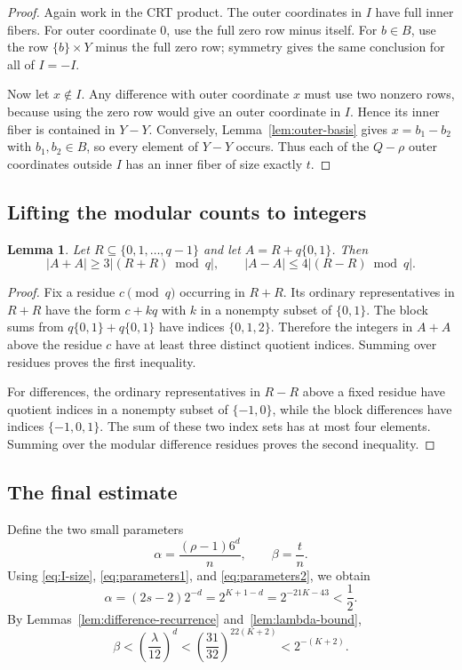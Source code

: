 \documentclass[11pt,reqno]{amsart}
\theoremstyle{plain}
\newtheorem{lemma}[theorem]{Lemma}
\theoremstyle{definition}
\theoremstyle{remark}
\theoremstyle{named}
\newcommand{\card}[1]{\lvert #1\rvert}
\begin{document}
\begin{proof}
Again work in the CRT product.  The outer coordinates in $I$ have full inner
fibers.  For outer coordinate $0$, use the full zero row minus itself.  For
$b\in B$, use the row $\{b\}\times Y$ minus the full zero row; symmetry gives
the same conclusion for all of $I=-I$.

Now let $x\notin I$.  Any difference with outer coordinate $x$ must use two
nonzero rows, because using the zero row would give an outer coordinate in
$I$.  Hence its inner fiber is contained in $Y-Y$.  Conversely,
Lemma~\ref{lem:outer-basis} gives $x=b_1-b_2$ with $b_1,b_2\in B$, so every
element of $Y-Y$ occurs.  Thus each of the $Q-\rho$ outer coordinates outside
$I$ has an inner fiber of size exactly $t$.
\end{proof}

\subsection{Lifting the modular counts to integers}

\begin{lemma}\label{lem:lifting}
Let $R\subseteq\{0,1,\ldots,q-1\}$ and let $A=R+q\{0,1\}$.  Then
\[
 \card{A+A}\ge3\card{(R+R)\bmod q},
 \qquad
 \card{A-A}\le4\card{(R-R)\bmod q}.
\]
\end{lemma}

\begin{proof}
Fix a residue $c\pmod q$ occurring in $R+R$.  Its ordinary representatives in
$R+R$ have the form $c+kq$ with $k$ in a nonempty subset of $\{0,1\}$.  The
block sums from $q\{0,1\}+q\{0,1\}$ have indices $\{0,1,2\}$.  Therefore the
integers in $A+A$ above the residue $c$ have at least three distinct quotient
indices.  Summing over residues proves the first inequality.

For differences, the ordinary representatives in $R-R$ above a fixed residue
have quotient indices in a nonempty subset of $\{-1,0\}$, while the block
differences have indices $\{-1,0,1\}$.  The sum of these two index sets has at
most four elements.  Summing over the modular difference residues proves the
second inequality.
\end{proof}

\subsection{The final estimate}

Define the two small parameters
\[
 \alpha=\frac{(\rho-1)6^d}{n},
 \qquad
 \beta=\frac{t}{n}.
\]
Using \eqref{eq:I-size}, \eqref{eq:parameters1}, and
\eqref{eq:parameters2}, we obtain
\begin{equation}\label{eq:alpha}
 \alpha=(2s-2)2^{-d}=2^{K+1-d}=2^{-21K-43}<\frac12.
\end{equation}
By Lemmas~\ref{lem:difference-recurrence} and~\ref{lem:lambda-bound},
\begin{equation}\label{eq:beta}
 \beta
 <\left(\frac{\lambda}{12}\right)^d
 <\left(\frac{31}{32}\right)^{22(K+2)}
 <2^{-(K+2)}.
\end{equation}
\end{document}
